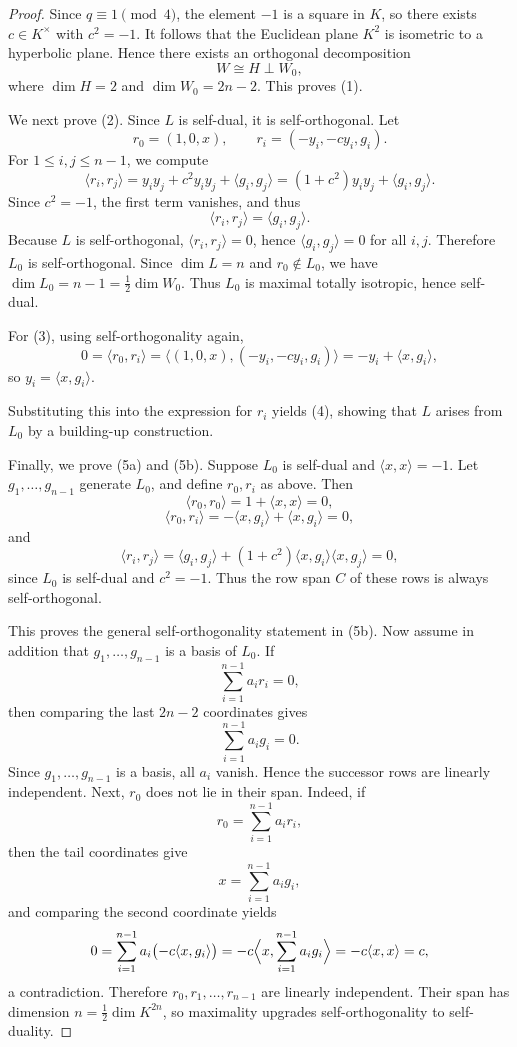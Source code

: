 \documentclass[12pt]{article}
\newenvironment{blueblock}{\begingroup\color{blue}}{\endgroup}
\begin{document}
\begin{blueblock}
\begin{proof}
Since $q \equiv 1 \pmod{4}$, the element $-1$ is a square in $K$, so there exists $c \in K^\times$ with $c^2=-1$.
It follows that the Euclidean plane $K^2$ is isometric to a hyperbolic plane.
Hence there exists an orthogonal decomposition
\[
W \cong H \perp W_0,
\]
where $\dim H = 2$ and $\dim W_0 = 2n-2$. This proves (1).

We next prove (2). Since $L$ is self-dual, it is self-orthogonal.
Let
\[
r_0 = (1,0,x), \qquad r_i = (-y_i,-c y_i,g_i).
\]
For $1 \le i,j \le n-1$, we compute
\[
\langle r_i,r_j\rangle
= y_i y_j + c^2 y_i y_j + \langle g_i,g_j\rangle
= (1 + c^2)y_i y_j + \langle g_i,g_j\rangle.
\]
Since $c^2 = -1$, the first term vanishes, and thus
\[
\langle r_i,r_j\rangle = \langle g_i,g_j\rangle.
\]
Because $L$ is self-orthogonal, $\langle r_i,r_j\rangle=0$, hence $\langle g_i,g_j\rangle=0$ for all $i,j$.
Therefore $L_0$ is self-orthogonal.
Since $\dim L = n$ and $r_0 \notin L_0$, we have $\dim L_0 = n-1 = \frac{1}{2}\dim W_0$.
Thus $L_0$ is maximal totally isotropic, hence self-dual.

For (3), using self-orthogonality again,
\[
0 = \langle r_0,r_i\rangle
= \langle (1,0,x),(-y_i,-c y_i,g_i)\rangle
= -y_i + \langle x,g_i\rangle,
\]
so $y_i = \langle x,g_i\rangle$.

Substituting this into the expression for $r_i$ yields (4), showing that $L$ arises from $L_0$ by a building-up construction.

Finally, we prove (5a) and (5b). Suppose $L_0$ is self-dual and $\langle x,x\rangle=-1$.
Let $g_1,\dots,g_{n-1}$ generate $L_0$, and define $r_0,r_i$ as above.
Then
\[
\langle r_0,r_0\rangle = 1 + \langle x,x\rangle = 0,
\]
\[
\langle r_0,r_i\rangle = -\langle x,g_i\rangle + \langle x,g_i\rangle = 0,
\]
and
\[
\langle r_i,r_j\rangle
= \langle g_i,g_j\rangle + (1+c^2)\langle x,g_i\rangle \langle x,g_j\rangle
= 0,
\]
since $L_0$ is self-dual and $c^2=-1$.
Thus the row span $C$ of these rows is always self-orthogonal.

This proves the general self-orthogonality statement in (5b). Now assume in addition that $g_1,\dots,g_{n-1}$ is a basis of $L_0$. If
\[
\sum_{i=1}^{n-1} a_i r_i = 0,
\]
then comparing the last $2n-2$ coordinates gives
\[
\sum_{i=1}^{n-1} a_i g_i = 0.
\]
Since $g_1,\dots,g_{n-1}$ is a basis, all $a_i$ vanish. Hence the successor rows are linearly independent. Next, $r_0$ does not lie in their span. Indeed, if
\[
r_0=\sum_{i=1}^{n-1} a_i r_i,
\]
then the tail coordinates give
\[
x=\sum_{i=1}^{n-1} a_i g_i,
\]
and comparing the second coordinate yields
\[
0=\sum_{i=1}^{n-1} a_i\bigl(-c\langle x,g_i\rangle\bigr)
=-c\Bigl\langle x,\sum_{i=1}^{n-1} a_i g_i\Bigr\rangle
=-c\langle x,x\rangle
=c,
\]
a contradiction. Therefore $r_0,r_1,\dots,r_{n-1}$ are linearly independent. Their span has dimension $n=\frac12\dim K^{2n}$, so maximality upgrades self-orthogonality to self-duality.


\end{proof}
\end{blueblock}
\end{document}
